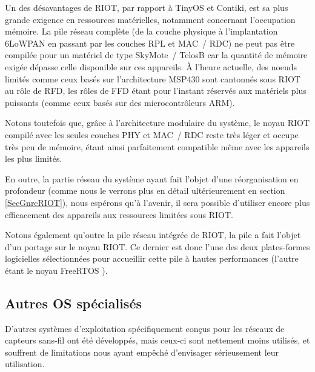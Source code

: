 \medskip

Un des désavantages de RIOT, par rapport à TinyOS et Contiki, est sa
plus grande exigence en ressources matérielles, notamment concernant
l'occupation mémoire. La pile réseau complète (de la couche physique
à l'implantation 6LoWPAN en passant par les couches RPL et MAC~/ RDC)
ne peut pas être compilée pour un matériel de type SkyMote~/ TelosB
car la quantité de mémoire exigée dépasse celle disponible sur ces
appareils. À l'heure actuelle, des noeuds limités comme ceux basés
sur l'architecture MSP430 sont cantonnés sous RIOT au rôle de RFD,
les rôles de FFD étant pour l'instant réservés aux matériels plus
puissants (comme ceux basés sur des microcontrôleurs ARM).

Notons toutefois que, grâce à l'architecture modulaire du système,
le noyau RIOT compilé avec les seules couches PHY et MAC~/ RDC reste
très léger et occupe très peu de mémoire, étant ainsi parfaitement
compatible même avec les appareils les plus limités. 

En outre, la partie réseau du système ayant fait l'objet d'une
réorganisation en profondeur (comme nous le verrons plus en détail
ultérieurement en section \vref{SecGnrcRIOT}), nous espérons qu'à
l'avenir, il sera possible d'utiliser encore plus efficacement
des appareils aux ressources limitées sous RIOT.

\medskip

Notons également qu'outre la pile réseau intégrée de RIOT, la pile
 \cite{OpenWSN} a fait l'objet d'un portage sur le noyau
RIOT. Ce dernier est donc l'une des deux plates-formes logicielles
sélectionnées pour accueillir cette pile à hautes performances (l'autre
étant le noyau FreeRTOS \cite{FreeRTOS}). 


\subsection{Autres OS spécialisés}
\label{SubsecAutresOS}

D'autres systèmes d'exploitation spécifiquement conçus pour les réseaux
de capteurs sans-fil ont été développés, mais ceux-ci sont nettement
moins utilisés, et souffrent de limitations nous ayant empêché 
d'envisager sérieusement leur utilisation.

